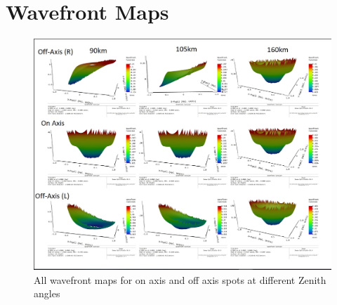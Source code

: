 
\chapter{Wavefront Maps} %

\label{AppendixA} %

\begin{figure}[h!]
\centering
\includegraphics[width=14 cm]{Figures/wavefront_all.jpg}
\caption{All wavefront maps for on axis and off axis spots at different Zenith angles}
\end{figure}